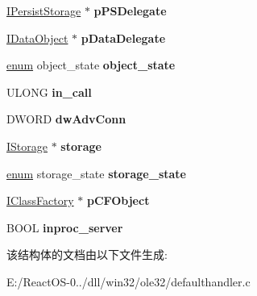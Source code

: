 \begin{DoxyCompactItemize}
\hyperlink{interface_i_persist_storage}{I\+Persist\+Storage} $\ast$ {\bfseries p\+P\+S\+Delegate}
\item 
\mbox{\label{struct_default_handler_aa13123ed77eaa698f3183032042105f0}} 
\hyperlink{interface_i_data_object}{I\+Data\+Object} $\ast$ {\bfseries p\+Data\+Delegate}
\item 
\mbox{\label{struct_default_handler_a3728657a85c28606bd261448de1d4b62}} 
\hyperlink{interfaceenum}{enum} object\+\_\+state {\bfseries object\+\_\+state}
\item 
\mbox{\label{struct_default_handler_aa0f6904090de942a6ca43e06e0035dd1}} 
U\+L\+O\+NG {\bfseries in\+\_\+call}
\item 
\mbox{\label{struct_default_handler_a6ba6c949125faaef337ce187eacda586}} 
D\+W\+O\+RD {\bfseries dw\+Adv\+Conn}
\item 
\mbox{\label{struct_default_handler_a730e977427b24ee86e1daa5e304b2fc4}} 
\hyperlink{interface_i_storage}{I\+Storage} $\ast$ {\bfseries storage}
\item 
\mbox{\label{struct_default_handler_a3486975caa89cd3fa26bb60cda22814a}} 
\hyperlink{interfaceenum}{enum} storage\+\_\+state {\bfseries storage\+\_\+state}
\item 
\mbox{\label{struct_default_handler_addc207996342480f35b43d544b670bf9}} 
\hyperlink{interface_i_class_factory}{I\+Class\+Factory} $\ast$ {\bfseries p\+C\+F\+Object}
\item 
\mbox{\label{struct_default_handler_acbcf3e8422c1f1dc3e504e00085c8dc5}} 
B\+O\+OL {\bfseries inproc\+\_\+server}
\end{DoxyCompactItemize}


该结构体的文档由以下文件生成\+:\begin{DoxyCompactItemize}
\item 
E\+:/\+React\+O\+S-\/0../dll/win32/ole32/defaulthandler.\+c\end{DoxyCompactItemize}
